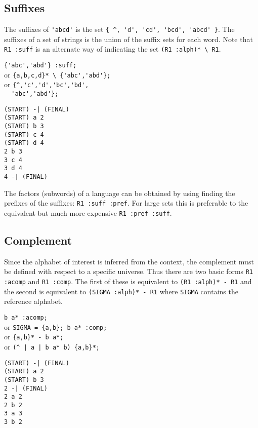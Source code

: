 \subsection{Suffixes}
The suffixes of \verb#'abcd'# is the set
\verb#{ ^, 'd', 'cd', 'bcd', 'abcd' }#.
The suffixes of a set of strings is the union of the suffix sets for each
word.
Note that \verb#R1 :suff# is an alternate way of indicating
the set \verb#(R1 :alph)* \ R1#.
\begin{center}\begin{minipage}[t]{3in}\begin{minipage}[t]{3in}\begin{tabbing}
\qquad \= \verb#{'abc','abd'} :suff;#\\
or \> \verb#{a,b,c,d}* \ {'abc','abd'};#\\
or \> \verb#{^,'c','d','bc','bd',#\\
\> \verb#  'abc','abd'};#
\end{tabbing}\end{minipage}\end{minipage}
\begin{minipage}[t]{1.6in}\begin{verbatim}
(START) -| (FINAL)
(START) a 2
(START) b 3
(START) c 4
(START) d 4
2 b 3
3 c 4
3 d 4
4 -| (FINAL)
\end{verbatim}\end{minipage}\end{center}
The factors (subwords) of a language can be obtained by using finding the
prefixes of the suffixes: \verb#R1 :suff :pref#.
For large sets this is preferable to the equivalent but much more expensive
\verb#R1 :pref :suff#.

\subsection{Complement}
Since the alphabet of interest is inferred from the context, the complement
must be defined with respect to a specific universe.
Thus there are two basic forms \verb#R1 :acomp# and \verb#R1 :comp#.
The first of these is equivalent to \verb#(R1 :alph)* - R1# and the second
is equivalent to \verb#(SIGMA :alph)* - R1# where \verb#SIGMA# contains the
reference alphabet.
\begin{center}\begin{minipage}[t]{3in}\begin{minipage}[t]{3in}\begin{tabbing}
\qquad \= \verb#b a* :acomp;#\\
or \> \verb#SIGMA = {a,b}; b a* :comp;#\\
or \> \verb#{a,b}* - b a*;#\\
or \> \verb#(^ | a | b a* b) {a,b}*;#
\end{tabbing}\end{minipage}\end{minipage}
\begin{minipage}[t]{1.6in}\begin{verbatim}
(START) -| (FINAL)
(START) a 2
(START) b 3
2 -| (FINAL)
2 a 2
2 b 2
3 a 3
3 b 2
\end{verbatim}\end{minipage}\end{center}

